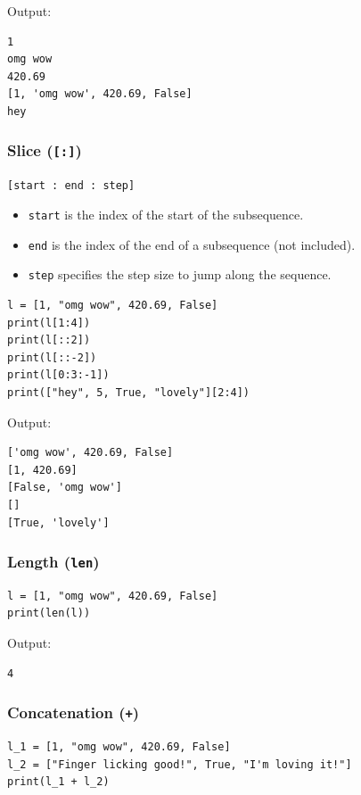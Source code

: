 \documentclass[11pt]{article}
\begin{document}
 \noindent Output:

\begin{verbatim}
1
omg wow
420.69
[1, 'omg wow', 420.69, False]
hey
\end{verbatim}


 \newpage

\subsubsection{Slice (\texttt{[:]})}
\label{sec:org948e56b}
\texttt{[start : end : step]}
\begin{itemize}
\item \texttt{start} is the index of the start of the subsequence.
\item \texttt{end} is the index of the end of a subsequence (not included).
\item \texttt{step} specifies the step size to jump along the sequence.
\end{itemize}

\begin{verbatim}
l = [1, "omg wow", 420.69, False]
print(l[1:4])
print(l[::2])
print(l[::-2])
print(l[0:3:-1])
print(["hey", 5, True, "lovely"][2:4])
\end{verbatim}

 \noindent Output:

\begin{verbatim}
['omg wow', 420.69, False]
[1, 420.69]
[False, 'omg wow']
[]
[True, 'lovely']
\end{verbatim}

\subsubsection{Length (\texttt{len})}
\label{sec:org4425670}
\begin{verbatim}
l = [1, "omg wow", 420.69, False]
print(len(l))
\end{verbatim}

 \noindent Output:

\begin{verbatim}
4
\end{verbatim}

\subsubsection{Concatenation (\texttt{+})}
\label{sec:orge4e1324}
\begin{verbatim}
l_1 = [1, "omg wow", 420.69, False]
l_2 = ["Finger licking good!", True, "I'm loving it!"]
print(l_1 + l_2)
\end{verbatim}
\end{document}
